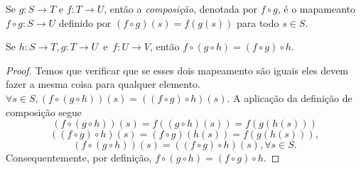 \begin{definition}
    Se $g:S \to T$ e $f:T \to U$, então a \textit{composição}, denotada por $f \circ g$, é o mapameanto $f \circ g: S \to U$ definido por $(f \circ g)(s) = f(g(s))$ para todo $s \in S$.
\end{definition}
\begin{lemma}
    Se $h:S \to T, g:T \to U$\ e\ $f:U \to V$, então $f\circ (g\circ h) = (f \circ g)\circ h.$
    \begin{proof}
        Temos que verificar que se esses dois mapeamento são iguais eles devem fazer a mesma coisa para qualquer elemento.\\
        $\forall s \in S, (f\circ(g\circ h))(s) = ((f \circ g)\circ h)(s).$ A aplicação da definição de composição segue $$(f\circ (g\circ h))(s)=f((g\circ h)(s))=f(g(h(s)))$$ $$((f\circ g)\circ h)(s)=(f\circ g)(h(s))=f(g(h(s))),$$ $$(f\circ (g \circ h))(s)=((f \circ g)\circ h)(s), \forall s \in S.$$
        Consequentemente, por definição, $f \circ (g \circ h) = (f\circ g) \circ h.$
    \end{proof}
\end{lemma}
